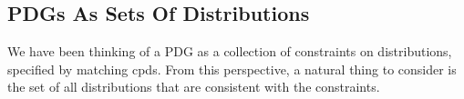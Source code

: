 \documentclass{article}
\theoremstyle{plain}
\theoremstyle{definition}
\theoremstyle{remark}
\numberwithin{equation}{section}
\begin{document}
\subsection{PDGs As Sets Of Distributions}\label{sec:set-of-distribution-semantics} 
	
	We have been thinking of a PDG as a collection of constraints
        on distributions, specified by matching cpds. From this
                perspective, a natural thing to consider is the set of
        all distributions that are consistent with the constraints.
	
\end{document}
